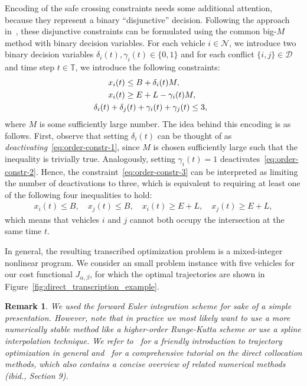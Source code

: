 \documentclass{report}
\theoremstyle{definition}
\theoremstyle{plain}
\newtheorem*{remark}{Remark}
\begin{document}
Encoding of the safe crossing constraints needs some additional attention,
because they represent a binary ``disjunctive'' decision.
%
Following the approach in~\cite{hultApproximateSolutionOptimal2015}, these disjunctive constraints can be formulated
using the common big-$M$ method with binary decision variables. For each vehicle
$i \in \mathcal{N}$, we introduce two binary decision variables
$\delta_{i}(t), \gamma_{i}(t) \in \{ 0, 1 \}$ and for each conflict $\{i, j\} \in \mathcal{D}$ and
time step $t \in \mathbb{T}$, we introduce the following constraints:
\begin{subequations}\label{eq:collision-avoidance-binary-encoding}
  \begin{align}
  x_{i}(t) &\leq B + \delta_{i}(t) M , \label{eq:order-constr-1} \\
  \quad x_{i}(t) &\geq E + L - \gamma_{i}(t) M , \label{eq:order-constr-2} \\
  & \hspace{-3.8em} \delta_{i}(t) + \delta_{j}(t) + \gamma_{i}(t) + \gamma_{j}(t) \leq 3 , \label{eq:order-constr-3}
  \end{align}
\end{subequations}
where $M$ is some sufficiently large number.
%
The idea behind this encoding is as follows.
%
First, observe that setting $\delta_{i}(t) $ can be thought of as
\emph{deactivating}~\eqref{eq:order-constr-1}, since $M$ is chosen sufficiently
large such that the inequality is trivially true. Analogously, setting
$\gamma_{i}(t) = 1$ deactivates~\eqref{eq:order-constr-2}.
%
Hence, the constraint~\eqref{eq:order-constr-3} can be interpreted as limiting
the number of deactivations to three, which is equivalent to requiring at least
one of the following four inequalities to hold:
\begin{align*}
  x_{i}(t) \leq B, \quad x_{j}(t) \leq B , \quad
  x_{i}(t) \geq E + L, \quad x_{j}(t) \geq E + L ,
\end{align*}
which means that vehicles $i$ and $j$ cannot both occupy the intersection at the
same time $t$.

In general, the resulting transcribed optimization problem is a mixed-integer
nonlinear program. We consider an small problem instance with five vehicles for
our cost functional $J_{\alpha,\beta}$, for which the optimal trajectories are
shown in Figure~\ref{fig:direct_transcription_example}.

\begin{remark}
  We used the forward Euler integration scheme for sake of a simple
  presentation. However, note that in practice we most likely want to use a more
  numerically stable method like a higher-order Runge-Kutta scheme or use a
  spline interpolation technique. We refer to~\cite{TrajectoryOptimization} for a friendly introduction to
  trajectory optimization in general and~\cite{kellyIntroductionTrajectoryOptimization2017} for a comprehensive tutorial on
  the direct collocation methods, which also contains a concise overview of
  related numerical methods (ibid., Section 9).
\end{remark}
\end{document}
